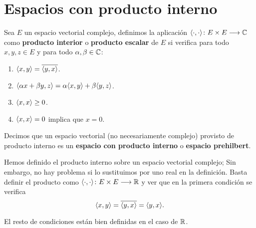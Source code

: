 \section{Espacios con producto interno}

\begin{definition} Sea $E$ un espacio vectorial complejo, definimos la aplicación $\langle\cdot,\cdot\rangle\colon E\times E\longrightarrow \mathbb{C}$ como \textbf{producto interior} o \textbf{producto escalar} de $E$ si verifica para todo $x,y,z\in E$ y para todo $\alpha,\beta\in\mathbb{C}$:
\begin{enumerate}[label=\alph*)]
\item $\langle x,y\rangle=\overline{\langle y,x\rangle}$.
\item $\langle\alpha x + \beta y,z\rangle= \alpha \langle x,y\rangle + \beta \langle y,z\rangle$.
\item $\langle x,x\rangle\geq 0$.
\item $\langle x,x\rangle= 0$ implica que $x=0$.
\end{enumerate}

Decimos que un espacio vectorial (no necesariamente complejo) provisto de producto interno es un \textbf{espacio con producto interno} o \textbf{espacio prehilbert}.
\end{definition}

\begin{observation} Hemos definido el producto interno sobre un espacio vectorial complejo; Sin embargo, no hay problema si lo sustituimos por uno real en la definición. Basta definir el producto como $\langle\cdot,\cdot\rangle\colon E\times E\longrightarrow \mathbb{R}$ y ver que en la primera condición se verifica
\[\langle x,y\rangle=\overline{\langle y,x\rangle}=\langle y,x\rangle.\]

El resto de condiciones están bien definidas en el caso de $\mathbb{R}$.
\end{observation}

